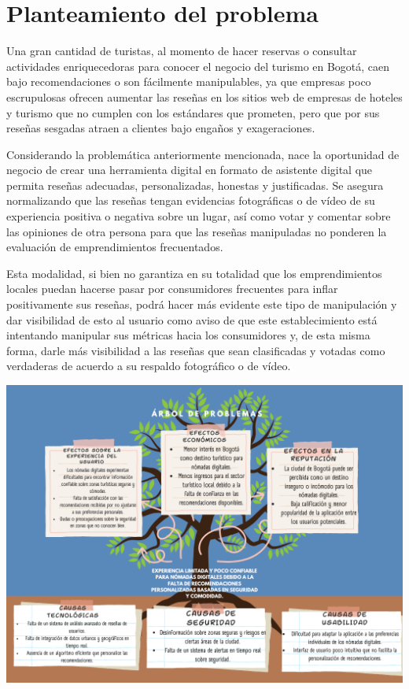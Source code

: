 \section{Planteamiento del problema}
Una gran cantidad de turistas, al momento de hacer reservas o consultar actividades enriquecedoras para conocer el negocio del turismo en Bogotá, caen bajo recomendaciones o son fácilmente manipulables, ya que empresas poco escrupulosas ofrecen aumentar las reseñas en los sitios web de empresas de hoteles y turismo que no cumplen con los estándares que prometen, pero que por sus reseñas sesgadas atraen a clientes bajo engaños y exageraciones.

Considerando la problemática anteriormente mencionada, nace la oportunidad de negocio de crear una herramienta digital en formato de asistente digital que permita reseñas adecuadas, personalizadas, honestas y justificadas. Se asegura normalizando que las reseñas tengan evidencias fotográficas o de vídeo de su experiencia positiva o negativa sobre un lugar, así como votar y comentar sobre las opiniones de otra persona para que las reseñas manipuladas no ponderen la evaluación de emprendimientos frecuentados.

Esta modalidad, si bien no garantiza en su totalidad que los emprendimientos locales puedan hacerse pasar por consumidores frecuentes para inflar positivamente sus reseñas, podrá hacer más evidente este tipo de manipulación y dar visibilidad de esto al usuario como aviso de que este establecimiento está intentando manipular sus métricas hacia los consumidores y, de esta misma forma, darle más visibilidad a las reseñas que sean clasificadas y votadas como verdaderas de acuerdo a su respaldo fotográfico o de vídeo.
\begin{adjustbox}{
    center,
    caption=[{Árbol de problemas}]{\centering Árbol de problemas. Fuente: Autores},
    label={arbol de problemas},
    nofloat=figure}

    \includegraphics[scale= 0.6]{Content/Images/Gráfica Árbol de problemas Emprendimiento.png}

\end{adjustbox}






